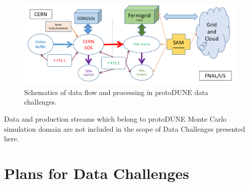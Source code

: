 \documentclass[pdftex,12pt,letter]{article}
\newcommand{\pd}{protoDUNE\xspace}
\begin{document}
\begin{figure}[tbh]
  \centering
  \includegraphics[width=1.0\textwidth]{figures/data_challenge_1.pdf}
  \caption{Schematics of data flow and  processing in \pd data challenges.}
  \label{fig:dc1}
\end{figure}
\noindent Data and production streams which belong to \pd Monte Carlo simulation domain are not included in the
scope of Data Challenges presented here.

\section{Plans for Data Challenges}
\end{document}
